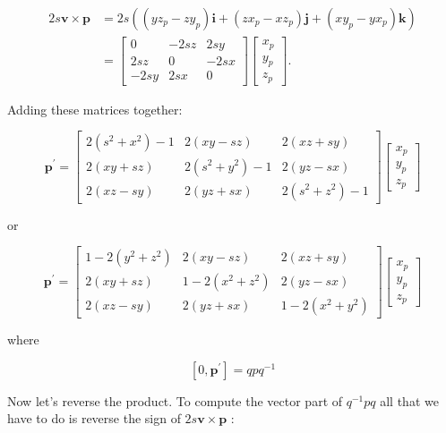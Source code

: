$$
\begin{aligned}
2 s \mathbf{v} \times \mathbf{p} & =2 s\left(\left(y z_{p}-z y_{p}\right) \mathbf{i}+\left(z x_{p}-x z_{p}\right) \mathbf{j}+\left(x y_{p}-y x_{p}\right) \mathbf{k}\right) \\
& =\left[\begin{array}{ccc}
0 & -2 s z & 2 s y \\
2 s z & 0 & -2 s x \\
-2 s y & 2 s x & 0
\end{array}\right]\left[\begin{array}{l}
x_{p} \\
y_{p} \\
z_{p}
\end{array}\right] .
\end{aligned}
$$

Adding these matrices together:

$$
\mathbf{p}^{\prime}=\left[\begin{array}{ccc}
2\left(s^{2}+x^{2}\right)-1 & 2(x y-s z) & 2(x z+s y) \\
2(x y+s z) & 2\left(s^{2}+y^{2}\right)-1 & 2(y z-s x) \\
2(x z-s y) & 2(y z+s x) & 2\left(s^{2}+z^{2}\right)-1
\end{array}\right]\left[\begin{array}{l}
x_{p} \\
y_{p} \\
z_{p}
\end{array}\right]
$$

or

$$
\mathbf{p}^{\prime}=\left[\begin{array}{ccc}
1-2\left(y^{2}+z^{2}\right) & 2(x y-s z) & 2(x z+s y) \\
2(x y+s z) & 1-2\left(x^{2}+z^{2}\right) & 2(y z-s x) \\
2(x z-s y) & 2(y z+s x) & 1-2\left(x^{2}+y^{2}\right)
\end{array}\right]\left[\begin{array}{l}
x_{p} \\
y_{p} \\
z_{p}
\end{array}\right]
$$

where

$$
\left[0, \mathbf{p}^{\prime}\right]=q p q^{-1}
$$

Now let's reverse the product. To compute the vector part of $q^{-1} p q$ all that we have to do is reverse the sign of $2 s \mathbf{v} \times \mathbf{p}$ :

